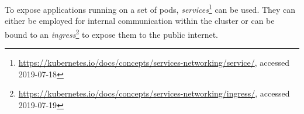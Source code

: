 To expose applications running on a set of pods, \textit{services}\footnote{\url{https://kubernetes.io/docs/concepts/services-networking/service/}, accessed 2019-07-18} can be used. They can either be employed for internal communication within the cluster or can be bound to an \textit{ingress}\footnote{\url{https://kubernetes.io/docs/concepts/services-networking/ingress/}, accessed 2019-07-19} to expose them to the public internet. 

